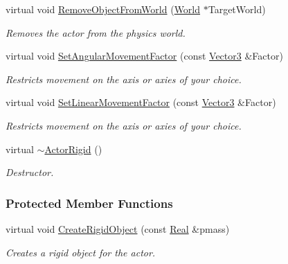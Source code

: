 \begin{DoxyCompactItemize}
virtual void \hyperlink{classphys_1_1ActorRigid_a7101df2a149e0ccb3678b7c2c00998f8}{RemoveObjectFromWorld} (\hyperlink{classphys_1_1World}{World} $\ast$TargetWorld)
\begin{DoxyCompactList}\small\item\em Removes the actor from the physics world. \item\end{DoxyCompactList}\item 
virtual void \hyperlink{classphys_1_1ActorRigid_a574fc272f603b879643872dbced36cc2}{SetAngularMovementFactor} (const \hyperlink{classphys_1_1Vector3}{Vector3} \&Factor)
\begin{DoxyCompactList}\small\item\em Restricts movement on the axis or axies of your choice. \item\end{DoxyCompactList}\item 
virtual void \hyperlink{classphys_1_1ActorRigid_a2a6aca8c598716ee24558878f869f163}{SetLinearMovementFactor} (const \hyperlink{classphys_1_1Vector3}{Vector3} \&Factor)
\begin{DoxyCompactList}\small\item\em Restricts movement on the axis or axies of your choice. \item\end{DoxyCompactList}\item 
virtual \hyperlink{classphys_1_1ActorRigid_ab317b5a2578157e54655a1aea8f4d058}{$\sim$ActorRigid} ()
\begin{DoxyCompactList}\small\item\em Destructor. \item\end{DoxyCompactList}\end{DoxyCompactItemize}
\subsubsection*{Protected Member Functions}
\begin{DoxyCompactItemize}
\item 
virtual void \hyperlink{classphys_1_1ActorRigid_a3d50613a6992e7de6a09d3e710d83b60}{CreateRigidObject} (const \hyperlink{namespacephys_af7eb897198d265b8e868f45240230d5f}{Real} \&pmass)
\begin{DoxyCompactList}\small\item\em Creates a rigid object for the actor. \item\end{DoxyCompactList}\end{DoxyCompactItemize}
